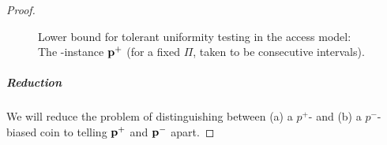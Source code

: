 \begin{proof}
\begin{figure}[!ht]
\caption{\label{fig:construction:lb:tolerant:uniformity:D:pm}Lower bound for tolerant uniformity testing in the \pdfsamp access model: The \yes-instance $\mathbf{p}^+$ (for a fixed $\Pi$, taken to be consecutive intervals).}
\end{figure}
  
  \subparagraph{Reduction} We will reduce the problem of distinguishing between \textsf{(a)} a $p^+$- and \textsf{(b)} a $p^-$-biased coin to telling $\mathbf{p}^+$ and $\mathbf{p}^-$ apart.
  

\end{proof}
